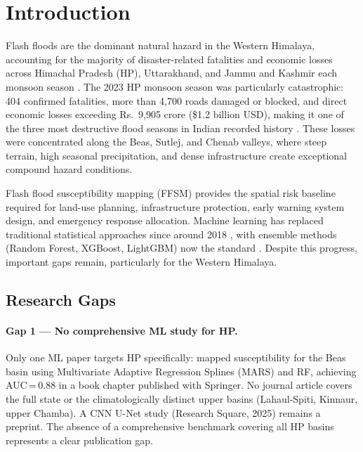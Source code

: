 \section{Introduction}
\label{sec:introduction}

Flash floods are the dominant natural hazard in the Western Himalaya,
accounting for the majority of disaster-related fatalities and economic losses
across Himachal Pradesh (HP), Uttarakhand, and Jammu and Kashmir each monsoon season
\citep{kumar2022hp, dixit2026nhess}.
The 2023 HP monsoon season was particularly catastrophic: 404 confirmed fatalities,
more than 4,700 roads damaged or blocked, and direct economic losses exceeding
Rs.\ 9,905 crore (\$1.2 billion USD), making it one of the three most destructive
flood seasons in Indian recorded history \citep{ndma2023, hiflodot2025}.
These losses were concentrated along the Beas, Sutlej, and Chenab valleys,
where steep terrain, high seasonal precipitation, and dense infrastructure create
exceptional compound hazard conditions.

Flash flood susceptibility mapping (FFSM) provides the spatial risk baseline
required for land-use planning, infrastructure protection, early warning system design,
and emergency response allocation.
Machine learning has replaced traditional statistical approaches since around 2018
\citep{abedi2021, bentivoglio2022review, ghosh2023karnali},
with ensemble methods (Random Forest, XGBoost, LightGBM) now the standard
\citep{chen2023rules, kosi2025ml}.
Despite this progress, important gaps remain, particularly for the Western Himalaya.

\subsection{Research Gaps}
\label{sec:gaps}

\paragraph{Gap 1 --- No comprehensive ML study for HP.}
Only one ML paper targets HP specifically:
\citet{saha2023} mapped susceptibility for the Beas basin using
Multivariate Adaptive Regression Splines (MARS) and RF, achieving AUC\,=\,0.88
in a book chapter published with Springer.
No journal article covers the full state or the climatologically distinct upper basins
(Lahaul-Spiti, Kinnaur, upper Chamba).
A CNN U-Net study (Research Square, 2025) remains a preprint.
The absence of a comprehensive benchmark covering all HP basins represents a clear
publication gap.

